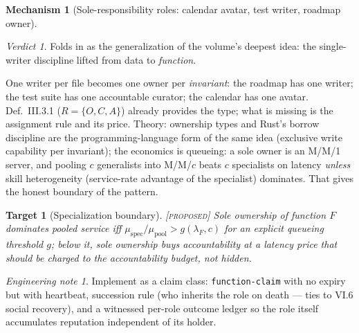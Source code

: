 \documentclass[11pt,a4paper]{article}
\newtheorem{target}{Target}[section]
\theoremstyle{definition}
\newtheorem{mech}{Mechanism}
\theoremstyle{remark}
\newtheorem*{verdict}{Verdict}
\newtheorem*{note}{Engineering note}
\newcommand{\grade}[1]{\textsc{[#1]}}
\begin{document}
\begin{mech}[Sole-responsibility roles: calendar avatar, test writer, roadmap owner]
\begin{verdict} Folds in as the generalization of the volume's deepest idea: the single-writer discipline lifted from data to \emph{function}. \end{verdict}
One writer per file becomes one owner per \emph{invariant}: the roadmap has one writer; the test suite has one accountable curator; the calendar has one avatar. Def.~III.3.1 ($R = \{O, C, A\}$) already provides the type; what is missing is the assignment rule and its price. Theory: ownership types and Rust's borrow discipline are the programming-language form of the same idea (exclusive write capability per invariant); the economics is queueing: a sole owner is an M/M/1 server, and pooling $c$ generalists into M/M/$c$ beats $c$ specialists on latency \emph{unless} skill heterogeneity (service-rate advantage of the specialist) dominates. That gives the honest boundary of the pattern.
\begin{target}[Specialization boundary]\grade{proposed} Sole ownership of function $F$ dominates pooled service iff $\mu_{\text{spec}} / \mu_{\text{pool}} > g(\lambda_F, c)$ for an explicit queueing threshold $g$; below it, sole ownership buys accountability at a latency price that should be charged to the accountability budget, not hidden. \end{target}
\begin{note} Implement as a claim class: \texttt{function-claim} with no expiry but with heartbeat, succession rule (who inherits the role on death --- ties to VI.6 social recovery), and a witnessed per-role outcome ledger so the role itself accumulates reputation independent of its holder. \end{note}
\end{mech}
\end{document}
